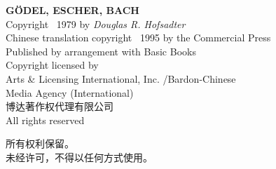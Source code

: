 

\begingroup
%
%
%
%
%
%
\centering
\small

\textbf{GÖDEL, ESCHER, BACH}\\
Copyright \textcopyright\ 1979 by \textit{Douglas R. Hofsadter}\\
Chinese translation copyright \textcopyright\ 1995 by the Commercial Press\\
Published by arrangement with Basic Books\\
Copyright licensed by\\
Arts \& Licensing International, Inc. /Bardon-Chinese\\
Media Agency (International)\\
博达著作权代理有限公司\\
All rights reserved

\vfill\nointerlineskip
\large\kaishu

所有权利保留。\\
未经许可，不得以任何方式使用。

\vfill
\normalfont\small

